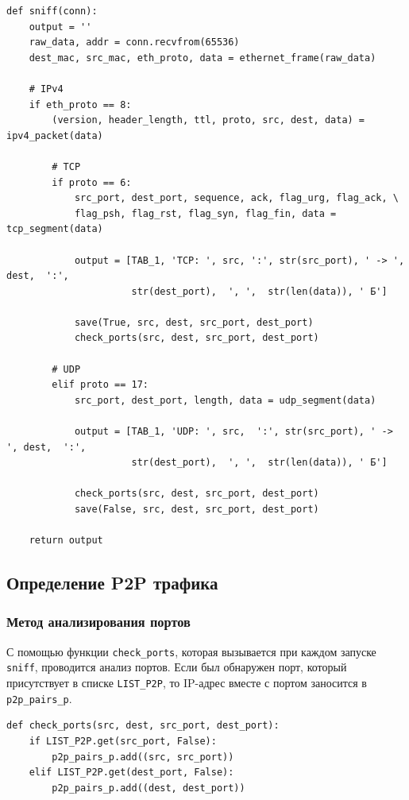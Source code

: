 \documentclass[bachelor, och, coursework]{SCWorks}
\begin{document}
\begin{verbatim}
def sniff(conn):
    output = ''
    raw_data, addr = conn.recvfrom(65536)
    dest_mac, src_mac, eth_proto, data = ethernet_frame(raw_data)

    # IPv4
    if eth_proto == 8:
        (version, header_length, ttl, proto, src, dest, data) = ipv4_packet(data)

        # TCP
        if proto == 6:
            src_port, dest_port, sequence, ack, flag_urg, flag_ack, \
            flag_psh, flag_rst, flag_syn, flag_fin, data = tcp_segment(data)

            output = [TAB_1, 'TCP: ', src, ':', str(src_port), ' -> ', dest,  ':',
                      str(dest_port),  ', ',  str(len(data)), ' Б']

            save(True, src, dest, src_port, dest_port)
            check_ports(src, dest, src_port, dest_port)

        # UDP
        elif proto == 17:
            src_port, dest_port, length, data = udp_segment(data)

            output = [TAB_1, 'UDP: ', src,  ':', str(src_port), ' -> ', dest,  ':',
                      str(dest_port),  ', ',  str(len(data)), ' Б']

            check_ports(src, dest, src_port, dest_port)
            save(False, src, dest, src_port, dest_port)

    return output
\end{verbatim}

\subsection{Определение P2P трафика}
\subsubsection{Метод анализирования портов}
С помощью функции \texttt{check_ports}, которая вызывается при каждом запуске \texttt{sniff}, проводится анализ портов. 
Если был обнаружен порт, который присутствует в списке \texttt{LIST_P2P}, то IP-адрес вместе с портом заносится в \texttt{p2p_pairs_p}.

\begin{verbatim}
def check_ports(src, dest, src_port, dest_port):
    if LIST_P2P.get(src_port, False):
        p2p_pairs_p.add((src, src_port))
    elif LIST_P2P.get(dest_port, False):
        p2p_pairs_p.add((dest, dest_port))
\end{verbatim}
\end{document}
